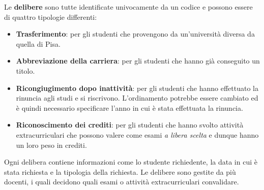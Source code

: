 Le \textbf{delibere} sono tutte identificate univocamente da un
codice e possono essere di quattro tipologie differenti:
\begin{itemize}
	\item \textbf{Trasferimento}: per gli studenti che
	      provengono da un'università diversa da quella di Pisa.
	\item \textbf{Abbreviazione della carriera}: per gli
	      studenti che hanno già conseguito un titolo.
	\item \textbf{Ricongiugimento dopo inattività}: per gli
	      studenti che hanno effettuato la rinuncia agli studi
	      e si riscrivono. L'ordinamento potrebbe essere
	      cambiato ed è quindi necessario specificare l'anno in
	      cui è stata effettuata la rinuncia.
	\item \textbf{Riconoscimento dei crediti}: per gli studenti
	      che hanno svolto attività extracurriculari che possono
          valere come esami \emph{a libera scelta} e dunque 
          hanno un loro peso in crediti.
\end{itemize}
Ogni delibera contiene informazioni come lo studente richiedente,
la data in cui è stata richiesta e la tipologia della richiesta.
Le delibere sono gestite da più docenti, i quali decidono quali
esami o attività extracurriculari convalidare.
